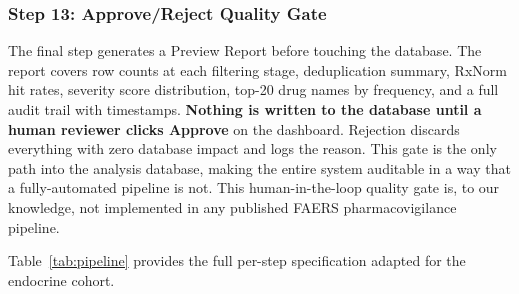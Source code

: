 \documentclass[10pt,twocolumn]{article}
\begin{document}
\subsubsection{Step 13: Approve/Reject Quality Gate}
 
The final step generates a Preview Report before touching the database. The report covers row counts at each filtering stage, deduplication summary, RxNorm hit rates, severity score distribution, top-20 drug names by frequency, and a full audit trail with timestamps. \textbf{Nothing is written to the database until a human reviewer clicks Approve} on the dashboard. Rejection discards everything with zero database impact and logs the reason. This gate is the only path into the analysis database, making the entire system auditable in a way that a fully-automated pipeline is not. This human-in-the-loop quality gate is, to our knowledge, not implemented in any published FAERS pharmacovigilance pipeline.
 
Table~\ref{tab:pipeline} provides the full per-step specification adapted for the endocrine cohort.
 
\end{document}
